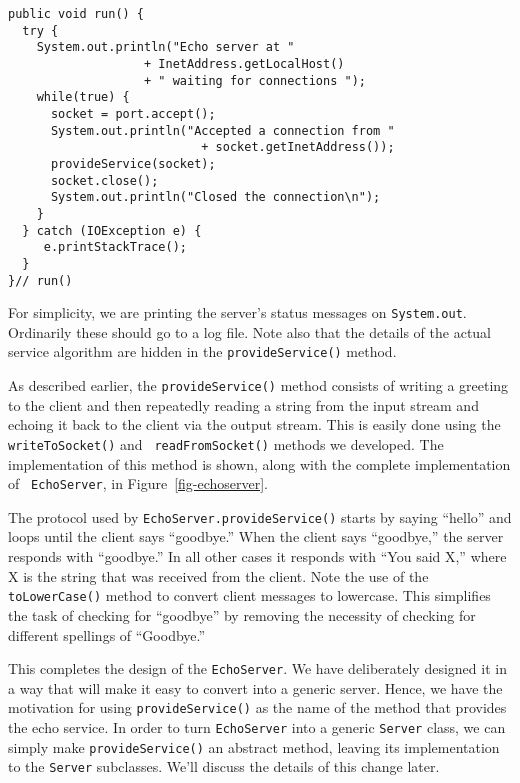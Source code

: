{\begin{jjjlisting}
\begin{lstlisting}
public void run() {
  try {
    System.out.println("Echo server at "
                   + InetAddress.getLocalHost() 
                   + " waiting for connections ");
    while(true) {
      socket = port.accept();
      System.out.println("Accepted a connection from " 
                           + socket.getInetAddress());
      provideService(socket);
      socket.close();
      System.out.println("Closed the connection\n");
    }
  } catch (IOException e) {
     e.printStackTrace();
  }
}// run()
\end{lstlisting}
\end{jjjlisting}

\noindent For simplicity, we are printing
the server's status messages on {\tt System.out}. Ordinarily these
should go to a log file.   Note also that the details of the actual
service algorithm are hidden in the {\tt provideService()} method.

As described earlier, the {\tt provideService()} method consists of
writing a greeting to the client and then repeatedly reading a string
from the input stream and echoing it back to the client via the output
stream.  This is easily done using the {\tt writeToSocket()} and {\tt
readFromSocket()} methods we developed.  The implementation of this
method is shown, along with the complete implementation of {\tt
EchoServer}, in Figure~\ref{fig-echoserver}.


The protocol used by {\tt EchoServer.provideService()} starts by
saying ``hello'' and loops until the client says ``goodbye.''  When
the client says ``goodbye,'' the server responds with ``goodbye.''  In
all other cases it responds with ``You said X,'' where X is the string
that was received from the client.   Note the use of the
{\tt toLowerCase()} method to convert client messages to lowercase.   This
simplifies the task of checking for ``goodbye'' by removing the necessity of
checking for different spellings of ``Goodbye.''


This completes the design of the {\tt EchoServer}. We have deliberately
designed it in a way that will make it easy to convert into a generic
server.  Hence, we have the motivation for using {\tt provideService()} as the
name of the method that provides the echo service.  In order to turn
{\tt EchoServer} into a generic {\tt Server} class, we can simply make
{\tt provideService()} an abstract method, leaving its implementation to
the {\tt Server} subclasses.  We'll discuss the details of this change
later.

}
